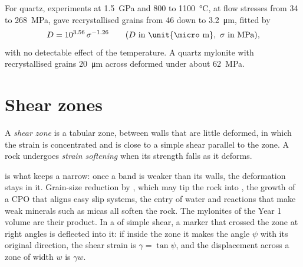 For quartz, experiments at \qty{1.5}{GPa} and 800 to \qty{1100}{\celsius}, at
flow stresses from 34 to \qty{268}{MPa}, gave recrystallised grains from 46 down
to \qty{3.2}{\micro m}, fitted by
\[
  D = 10^{3.56}\,\sigma^{-1.26}\qquad(D\text{ in \unit{\micro m}},\ \sigma\text{ in MPa}),
\]
with no detectable effect of the temperature. A quartz mylonite with
recrystallised grains \qty{20}{\micro m} across deformed under about
\qty{62}{MPa}.

\section{Shear zones}

\begin{definition}\label{def:b3:deformation-mechanisms:shear-zone}
A \emph{shear zone} is a tabular zone, between walls that are
little deformed, in which the strain is concentrated and is close to a simple
shear parallel to the zone. A rock undergoes \emph{strain
softening} when its strength falls as it deforms.
\end{definition}

 is what keeps a  narrow: once a band is weaker
than its walls, the deformation stays in it. Grain-size reduction by , which may tip the rock into , the growth of a
CPO that aligns easy slip systems, the entry of water and reactions that make
weak minerals such as micas all soften the rock. The mylonites of the Year 1
volume are their product. In a  of simple shear, a marker that
crossed the zone at right angles is deflected into it: if inside the zone it
makes the angle $\psi$ with its original direction, the shear strain is $\gamma
= \tan\psi$, and the displacement across a zone of width $w$ is $\gamma w$.

